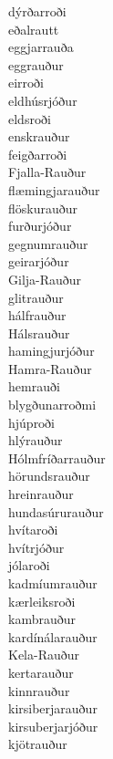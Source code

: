 \documentclass[../samsetningasafn.tex]{subfiles}
\begin{document}
\begin{bigwordlist}
\begin{footnotesize}
\begin{multicols}{4}
\begin{description}
		\item [dýrðarroði]
		\item [eðalrautt]
		\item [eggjarrauða]
		\item [eggrauður]
		\item [eirroði]
		\item [eldhúsrjóður]
		\item [eldsroði]
		\item [enskrauður]
		\item [feigðarroði]
		\item [Fjalla-Rauður]
		\item [flæmingjarauður]
		\item [flöskurauður]
		\item [furðurjóður]
		\item [gegnumrauður]
		\item [geirarjóður]
		\item [Gilja-Rauður]
		\item [glitrauður]
		\item [hálfrauður]
		\item [Hálsrauður]
		\item [hamingjurjóður]
		\item [Hamra-Rauður]
		\item [hemrauði]
		\item [blygðunarroðmi]
		\item [hjúproði]
		\item [hlýrauður]
		\item [Hólmfríðarrauður]
		\item [hörundsrauður]
		\item [hreinrauður]
		\item [hundasúrurauður]
		\item [hvítaroði]
		\item [hvítrjóður]
		\item [jólaroði]
		\item [kadmíumrauður]
		\item [kærleiksroði]
		\item [kambrauður]
		\item [kardínálarauður]
		\item [Kela-Rauður]
		\item [kertarauður]
		\item [kinnrauður]
		\item [kirsiberjarauður]
		\item [kirsuberjarjóður]
		\item [kjötrauður]

\end{description}
\end{multicols}
\end{footnotesize}
\end{bigwordlist}
\end{document}
